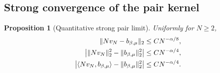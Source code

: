 \documentclass[11pt,reqno]{amsart}
\numberwithin{equation}{section}
\theoremstyle{plain}
\newtheorem{prop}[prop]{Proposition}
\theoremstyle{remark}
\DeclarePairedDelimiter{\norm}{\lVert}{\rVert}
\DeclarePairedDelimiter{\ipp}{\langle}{\rangle}
\newcommand{\be}{\beta}
\begin{document}
\subsection{Strong convergence of the pair kernel}
\label{subsec:strong-pair-estimate}

\begin{prop}[Quantitative strong pair limit]
\label{prop:exact-strong-second-hoeffding}
Uniformly for $N\geq2$,
\begin{align}
 \norm{Nv_N-b_{\be,\mu}}_2&\leq C N^{-\alpha/8},
 \label{eq:exact-strong-pair-limit}\\
 \left|\norm{Nv_N}_2^2-\norm{b_{\be,\mu}}_2^2\right|
 &\leq C N^{-\alpha/4},
 \label{eq:quantitative-pair-squared-norm}\\
 \left|\ipp*{Nv_N,b_{\be,\mu}}-\norm{b_{\be,\mu}}_2^2\right|
 &\leq C N^{-\alpha/4}.
 \label{eq:quantitative-pair-cross-term}
\end{align}
\end{prop}
\end{document}
